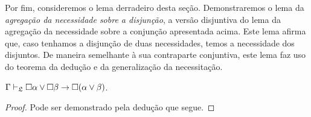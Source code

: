 \vspace{.5\baselineskip}
Por fim, consideremos o lema derradeiro desta seção.
Demonstraremos o lema da \emph{agregação da necessidade sobre a disjunção}, a versão disjuntiva do lema da agregação da necessidade sobre a conjunção apresentada acima.
Este lema afirma que, caso tenhamos a disjunção de duas necessidades, temos a necessidade dos disjuntos.
De maneira semelhante à sua contraparte conjuntiva, este lema faz uso do teorema da dedução e da generalização da necessitação.

\vspace{\baselineskip}
\begin{tcolorbox}[enhanced jigsaw, breakable, sharp corners, colframe=black, colback=white, boxrule=0.5pt, left=1.5mm, right=1.5mm, top=1.5mm, bottom=1.5mm]
    \begin{lemma}\label{necessity.disjunction.undistribution}
        $\Gamma\mathrel{\vdash}_\mathfrak{L}\Box\alpha\vee\Box\beta\to\Box(\alpha\vee\beta)$.
        \begin{proof}
        Pode ser demonstrado pela dedução que segue.


\end{proof}
\end{lemma}
\end{tcolorbox}
